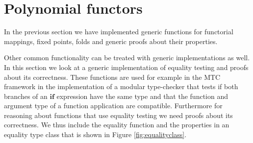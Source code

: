 \makeatother
\EndFmtInput
%



























\section{Polynomial functors}\label{sec:polynomial}

In the previous section we have implemented generic functions for
functorial mappings, fixed points, folds and generic proofs about
their properties.

Other common functionality can be treated with generic implementations
as well. In this section we look at a generic implementation of
equality testing and proofs about its correctness. These functions are
used for example in the MTC framework in the implementation of a
modular type-checker that tests if both branches of an \ensuremath{\mathbf{if}} expression
have the same type and that the function and argument type of a
function application are compatible. Furthermore for reasoning about
functions that use equality testing we need proofs about its
correctness. We thus include the equality function and the properties
in an equality type class that is shown in Figure
\ref{fig:equalityclass}.



